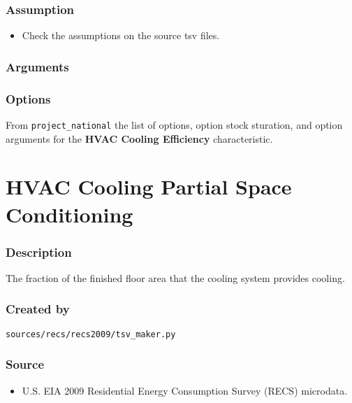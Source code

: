 \subsubsection{Assumption}\label{assumption-36}

\begin{itemize}
 
\item
  Check the assumptions on the source tsv files.
\end{itemize}

\subsubsection{Arguments}\label{arguments-41}



\subsubsection{Options}\label{options-64}

From \texttt{project\_national} the list of options, option stock
sturation, and option arguments for the \textbf{HVAC Cooling Efficiency}
characteristic.



\section{HVAC Cooling Partial Space
Conditioning}\label{hvac_cooling_partial_space_conditioning}

\subsubsection{Description}\label{description-65}

The fraction of the finished floor area that the cooling system provides
cooling.

\subsubsection{Created by}\label{created-by-65}

\texttt{sources/recs/recs2009/tsv\_maker.py}

\subsubsection{Source}\label{source-64}

\begin{itemize}
 
\item
  U.S. EIA 2009 Residential Energy Consumption Survey (RECS) microdata.
\end{itemize}

